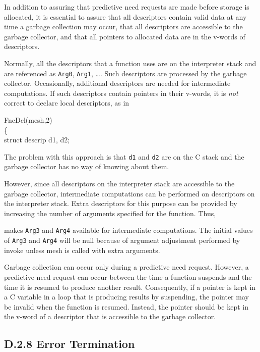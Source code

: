 In addition to assuring that predictive need requests are made before
storage is allocated, it is essential to assure that all descriptors
contain valid data at any time a garbage collection may occur, that
all descriptors are accessible to the garbage collector, and that all
pointers to allocated data are in the v-words of descriptors.

Normally, all the descriptors that a function uses are on the interpreter
stack and are referenced as \texttt{Arg0}, \texttt{Arg1}, \ldots.  Such
descriptors are processed by the garbage collector. Occasionally,
additional descriptors are needed for intermediate computations. If such
descriptors contain pointers in their v-words, it is \textit{not} correct
to declare local descriptors, as in
\goodbreak
\begin{iconcode}
\color{red}FncDcl(mesh,2)\\
\{\\
\>struct descrip d1, d2;
\end{iconcode}

\noindent
The problem with this approach is that \texttt{d1} and \texttt{d2} are on
the C stack and the garbage collector has no way of knowing about them.

However, since all descriptors on the interpreter stack are accessible
to the garbage collector, intermediate computations can be performed
on descriptors on the interpreter stack. Extra descriptors for this
purpose can be provided by increasing the number of arguments
specified for the function. Thus,


\noindent
makes \texttt{Arg3} and \texttt{Arg4} available for intermediate
computations. The initial values of \texttt{Arg3} and \texttt{Arg4} will be
null because of argument adjustment performed by invoke unless mesh is
called with extra arguments.

Garbage collection can occur only during a predictive need
request. However, a predictive need request can occur between the time
a function suspends and the time it is resumed to produce another
result. Consequently, if a pointer is kept in a C variable in a loop
that is producing results by suspending, the pointer may be invalid
when the function is resumed. Instead, the pointer should be kept in
the v-word of a descriptor that is accessible to the garbage
collector.

\subsection[D.2.8 Error Termination]{D.2.8 Error Termination}

